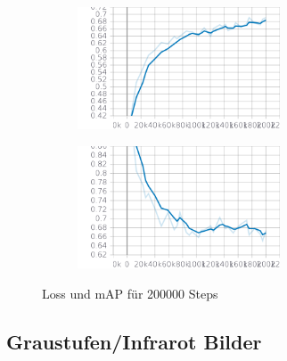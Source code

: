 \begin{figure}[htb]
    \centering
    \begin{subfigure}{6cm}
        \centering
        \includegraphics[width=6cm]{./Bilder/eval/mAP.png} %
    \end{subfigure}
    \begin{subfigure}{6cm}
        \centering
        \includegraphics[width=6cm]{./Bilder/eval/loss.png}
    \end{subfigure}
    \caption{Loss und mAP für 200000 Steps}
    \label{plot:map_loss}
\end{figure}


%         







\subsection{Graustufen/Infrarot Bilder}\label{subsec:eval_gray}

